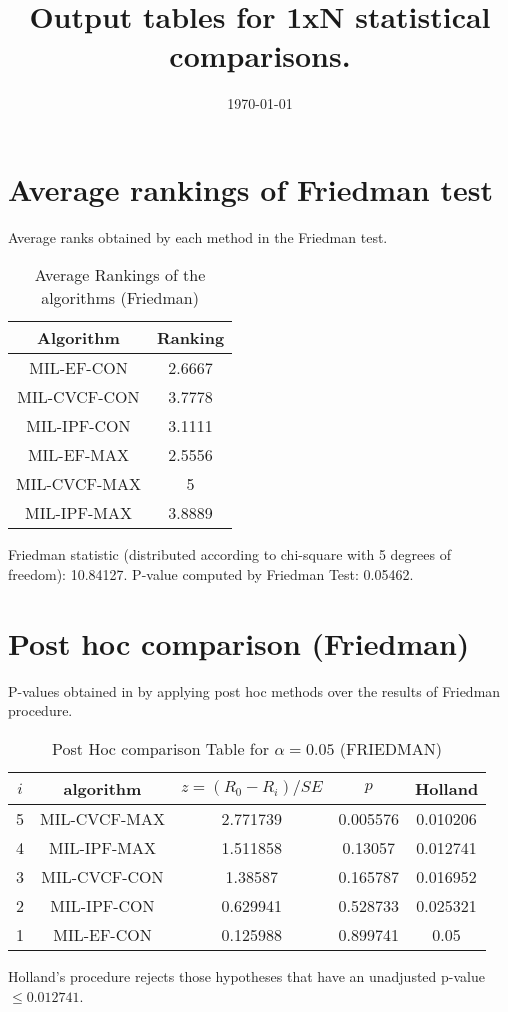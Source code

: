 \documentclass[a4paper,10pt]{article}
\title{Output tables for 1xN statistical comparisons.}
\author{}
\date{\today}
\begin{document}
\begin{landscape}
\pagestyle{empty}
\maketitle
\thispagestyle{empty}

\section{Average rankings of Friedman test}


Average ranks obtained by each method in the Friedman test.

\begin{table}[!htp]
\centering
\begin{tabular}{|c|c|}\hline
Algorithm&Ranking\\\hline
MIL-EF-CON&2.6667\\MIL-CVCF-CON&3.7778\\MIL-IPF-CON&3.1111\\MIL-EF-MAX&2.5556\\MIL-CVCF-MAX&5\\MIL-IPF-MAX&3.8889\\\hline\end{tabular}
\caption{Average Rankings of the algorithms (Friedman)}
\end{table}

Friedman statistic (distributed according to chi-square with 5 degrees of freedom): 10.84127. \newline P-value computed by Friedman Test: 0.05462.\newline


\newpage

\section{Post hoc comparison (Friedman)}


P-values obtained in by applying post hoc methods over the results of Friedman procedure.

\begin{table}[!htp]
\centering\footnotesize
\begin{tabular}{ccccc}
$i$&algorithm&$z=(R_0 - R_i)/SE$&$p$&Holland\\
\hline5&MIL-CVCF-MAX&2.771739&0.005576&0.010206\\4&MIL-IPF-MAX&1.511858&0.13057&0.012741\\3&MIL-CVCF-CON&1.38587&0.165787&0.016952\\2&MIL-IPF-CON&0.629941&0.528733&0.025321\\1&MIL-EF-CON&0.125988&0.899741&0.05\\\hline
\end{tabular}
\caption{Post Hoc comparison Table for $\alpha=0.05$ (FRIEDMAN)}
\end{table}Holland's procedure rejects those hypotheses that have an unadjusted p-value $\le0.012741$.



\end{landscape}
\end{document}
